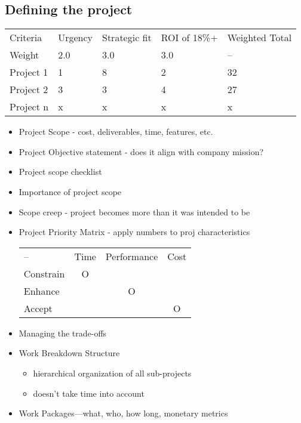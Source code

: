 \documentclass[8pt, letter]{extarticle}
\begin{document}
\begin{multicols}{2}
    \subsection{Defining the project}
    \begin{tabular}{ l l l l l }
        Criteria    & Urgency & Strategic fit & ROI of 18\%+ & Weighted Total     \\
        Weight      & 2.0   & 3.0   & 3.0   & --    \\
        Project 1   & 1     & 8     & 2     & 32    \\
        Project 2   & 3     & 3     & 4     & 27    \\
        Project n   & x     & x     & x     & x     \\
    \end{tabular}
    \begin{itemize}
        \item Project Scope - cost, deliverables, time, features, etc.
        \item Project Objective statement - does it align with company mission?
        \item Project scope checklist
        \item Importance of project scope
        \item Scope creep - project becomes more than it was intended to be
        \item Project Priority Matrix - apply numbers to proj characteristics
            \\
            \begin{tabular}{ l c c c }
                --&         Time&Performance& Cost  \\
                Constrain   &   O   &       &       \\
                Enhance     &       &   O   &       \\
                Accept      &       &       &   O   \\
            \end{tabular}
        \item Managing the trade-offs
        \item Work Breakdown Structure
            \begin{itemize}
                \item hierarchical organization of all sub-projects
                \item doesn't take time into account
            \end{itemize}
        \item Work Packages—what, who, how long, monetary metrics

\end{itemize}
\end{multicols}
\end{document}
